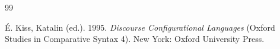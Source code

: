 \documentclass[ruler]{CUP-JNL-LIN}%
\begin{document}
\begin{Backmatter}
\begin{thebibliography}{99}

{É. Kiss, Katalin} (ed.). 1995. \textit{Discourse Configurational Languages} (Oxford Studies in Comparative Syntax 4). New York: Oxford University Press.




\end{thebibliography}
\end{Backmatter}
\end{document}
